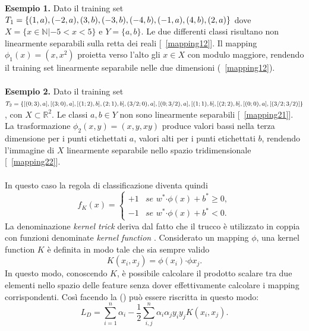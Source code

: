 \documentclass [11pt,a4paper,twoside,openright] {book}
\begin{document}
\textbf{Esempio 1.} Dato il training set $T_1=\lbrace (1,a),(-2,a),(3,b),(-3,b),(-4,b), \linebreak (-1,a),(4,b),(2,a) \rbrace$ dove $X = \lbrace x \in \mathbb{N} | -5 < x < 5 \rbrace$ e $Y=\lbrace a,b \rbrace$. Le due differenti classi risultano non linearmente separabili sulla retta dei reali [\figurename~\ref{mapping12}]. Il mapping $\phi_1(x)=(x,x^2)$ proietta verso l'alto gli $x \in X$ con modulo maggiore, rendendo il training set linearmente separabile nelle due dimensioni (\figurename~\ref{mapping12}).\\\\
\textbf{Esempio 2.} Dato il training set $T_2=\lbrace [(0;3),a], [(3;0),a], [(1;2),b], (2;1),b], \linebreak (3/2;0),a], [(0;3/2),a], [(1;1),b], [(2;2),b], [(0;0),a], [(3/2; 3/2)] \rbrace$, con $X \subset \mathbb{R}^2$. Le classi $a, b \in Y$ non sono linearmente separabili [\figurename~\ref{mapping21}]. La trasformazione $\phi_2(x,y)=(x,y,xy)$ produce valori bassi nella terza dimensione per i punti etichettati $a$, valori alti per i punti etichettati $b$, rendendo l'immagine di $X$ linearmente separabile nello spazio tridimensionale [\figurename~\ref{mapping22}].\\\\
In questo caso la regola di classificazione diventa quindi
\begin{equation}
f_K(x)=
\begin{cases}
+1 & \textit{se } w^* \boldsymbol{\cdot} \phi(x) + b^* \geq 0, \\
-1 & \textit{se } w^* \boldsymbol{\cdot} \phi(x)  + b^*< 0.
\end{cases}
\end{equation}
La denominazione \textit{kernel trick} deriva dal fatto che il trucco è utilizzato in coppia con funzioni denominate \textit{kernel function} \cite{shawe2004kernel}. Considerato un mapping $\phi$, una kernel function $K$ è definita in modo tale che sia sempre valido
\begin{equation}
K(x_i,x_j) = \phi(x_i) \boldsymbol{\cdot} \phi{x_j}.
\end{equation}
In questo modo, conoscendo $K$, è possibile calcolare il prodotto scalare tra due elementi nello spazio delle feature senza dover effettivamente calcolare i mapping corrispondenti. Così facendo la () può essere riscritta in questo modo:
\begin{equation}
L_D = \sum_{i=1}^n \alpha_i -\dfrac{1}{2} \sum_{i,j}^n \alpha_i \alpha_j y_i y_j K(x_i,x_j).
\end{equation}
\end{document}
